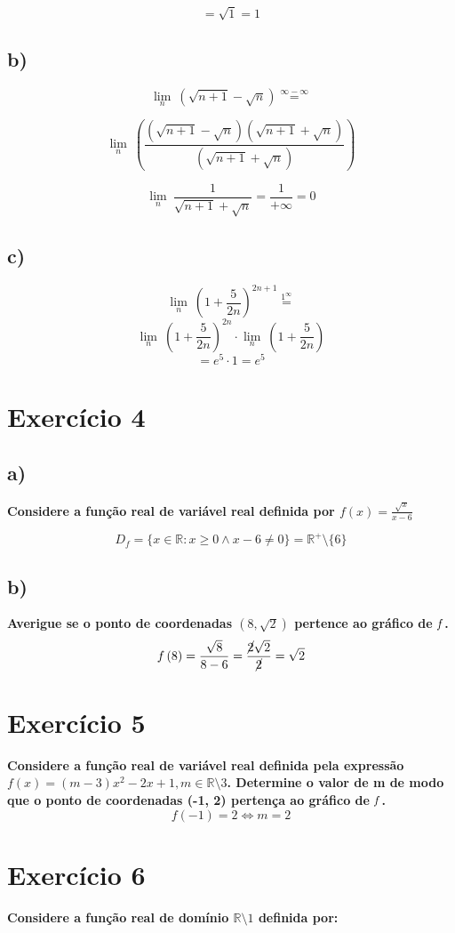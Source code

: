 \documentclass[a4paper]{article}
\begin{document}
	\[= \sqrt{1}=1\]
	
	\subsection*{b)}
	\[\lim\limits_{n}\ \left(\sqrt{n+1}-\sqrt{n}\right)\overset{\mathrm{\infty-\infty}}{=}\]
	
	\[\lim\limits_{n}\ \left(\frac{\left(\sqrt{n+1}-\sqrt{n}\right)\left(\sqrt{n+1}+\sqrt{n}\right)}{\left(\sqrt{n+1}+\sqrt{n}\right)}\right)\]
	
	\[\lim\limits_{n}\ \frac{1}{\sqrt{n+1}+\sqrt{n}} = \frac{1}{+\infty}=0\]
	
	\subsection*{c)}
	\[\lim\limits_{n}\ \left(1+\frac{5}{2n}\right)^{2n+1}\overset{\mathrm{1^{\infty}}}{=}\]
	\[\lim\limits_{n}\ \left(1+\frac{5}{2n}\right)^{2n} \cdot \lim\limits_{n}\ \left(1+\frac{5}{2n}\right)\]
	\[= e^{5} \cdot 1= e^{5}\]
	\section*{Exercício 4}
	\subsection*{a)}
	\textbf{Considere a função real de variável real definida por $f(x) = \frac{\sqrt{x}}{x-6}$}
	
	\[D_{f}=\{x \in \mathbb{R}:x \geq 0 \land x-6 \neq 0 \}=\mathbb{R}^+\setminus\{6\}\]
	
	\subsection*{b)}
	\textbf{Averigue se o ponto de coordenadas $\left(8,\sqrt{2}\right)$ pertence ao gráfico de $\it{f}$.}
	\[f\left(8\right)=\frac{\sqrt{8}}{8-6}=\frac{\cancel{2}\sqrt{2}}{\cancel{2}}=\sqrt{2}\]
	\section*{Exercício 5}
	\textbf{Considere a função real de variável real definida pela expressão
		$f(x) = (m-3)x^2 - 2x + 1, m \in \mathbb{R} \setminus {3}$. Determine o valor de m de modo que o ponto de coordenadas (-1, 2) pertença ao gráfico de $\it{f}$.}
	\[f(-1)=2 \Leftrightarrow m=2\]
	\section*{Exercício 6}
	\textbf{Considere a função real de domínio $\mathbb{R} \setminus {1}$ definida por:}
\end{document}
